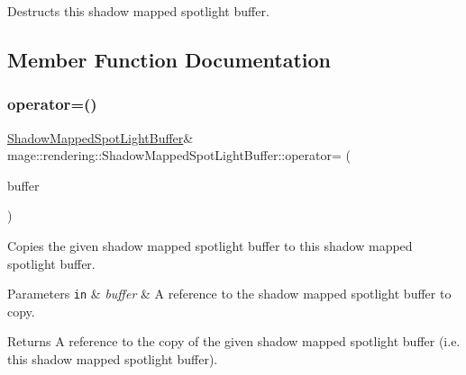 Destructs this shadow mapped spotlight buffer. 

\subsection{Member Function Documentation}
\mbox{\label{structmage_1_1rendering_1_1_shadow_mapped_spot_light_buffer_a2c209b2648740696d45113a152e648fb}} 
\subsubsection{\texorpdfstring{operator=()}{operator=()}\hspace{0.1cm}{\footnotesize\ttfamily [1/2]}}
{\footnotesize\ttfamily \mbox{\hyperlink{structmage_1_1rendering_1_1_shadow_mapped_spot_light_buffer}{Shadow\+Mapped\+Spot\+Light\+Buffer}}\& mage\+::rendering\+::\+Shadow\+Mapped\+Spot\+Light\+Buffer\+::operator= (\begin{DoxyParamCaption}\item[{const \mbox{\hyperlink{structmage_1_1rendering_1_1_shadow_mapped_spot_light_buffer}{Shadow\+Mapped\+Spot\+Light\+Buffer}} \&}]{buffer }\end{DoxyParamCaption})\hspace{0.3cm}{\ttfamily [default]}}

Copies the given shadow mapped spotlight buffer to this shadow mapped spotlight buffer.


\begin{DoxyParams}[1]{Parameters}
\mbox{\tt in}  & {\em buffer} & A reference to the shadow mapped spotlight buffer to copy. \\
\hline
\end{DoxyParams}
\begin{DoxyReturn}{Returns}
A reference to the copy of the given shadow mapped spotlight buffer (i.\+e. this shadow mapped spotlight buffer). 
\end{DoxyReturn}
\mbox{\label{structmage_1_1rendering_1_1_shadow_mapped_spot_light_buffer_ae2687b41af138b43fc814883310a877b}} 
